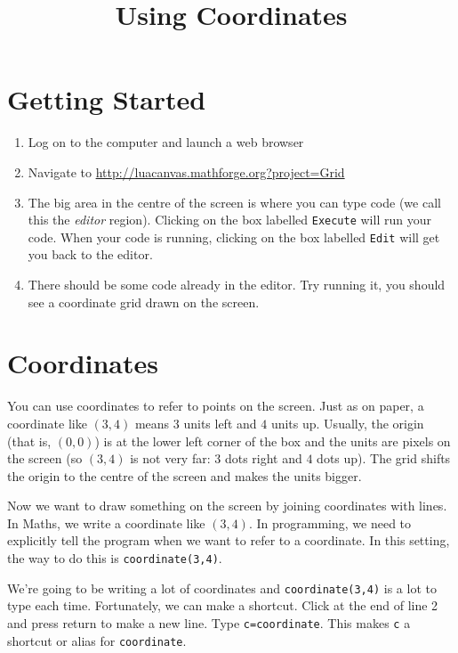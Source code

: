 \documentclass[
  xhtml,%
  use filename%
]{internet}
\title{Using Coordinates}
\begin{document}
\maketitle
\section{Getting Started}

\begin{enumerate}
\item Log on to the computer and launch a web browser
\item Navigate to \href{http://luacanvas.mathforge.org?project=Grid}{http://luacanvas.mathforge.org?project=Grid}
\item The big area in the centre of the screen is where you can type code (we call this the \emph{editor} region).
Clicking on the box labelled \verb+Execute+ will run your code.
When your code is running, clicking on the box labelled \verb+Edit+ will get you back to the editor.

\item There should be some code already in the editor.
Try running it, you should see a coordinate grid drawn on the screen.
\end{enumerate}

\section{Coordinates}

You can use coordinates to refer to points on the screen.
Just as on paper, a coordinate like \((3,4)\) means \(3\) units left and \(4\) units up.
Usually, the origin (that is, \((0,0)\)) is at the lower left corner of the box and the units are pixels on the screen (so \((3,4)\) is not very far: \(3\) dots right and \(4\) dots up).
The grid shifts the origin to the centre of the screen and makes the units bigger.

Now we want to draw something on the screen by joining coordinates with lines.
In Maths, we write a coordinate like \((3,4)\).
In programming, we need to explicitly tell the program when we want to refer to a coordinate.
In this setting, the way to do this is \verb+coordinate(3,4)+.

We're going to be writing a lot of coordinates and \verb+coordinate(3,4)+ is a lot to type each time.
Fortunately, we can make a shortcut.
Click at the end of line 2 and press return to make a new line.
Type \verb+c=coordinate+.
This makes \verb+c+ a shortcut or alias for \verb+coordinate+.
\end{document}
